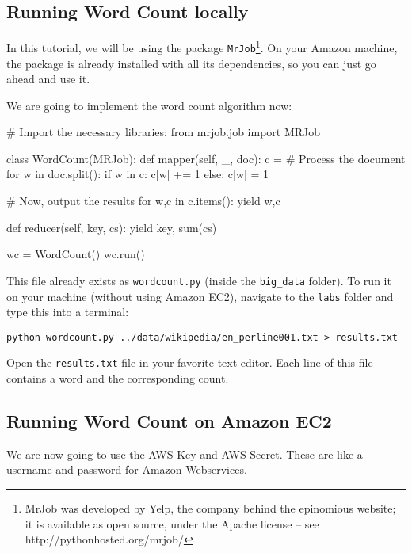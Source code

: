 \subsection{Running Word Count locally}

In this tutorial, we will be using the package \texttt{MrJob}\footnote{MrJob was developed by Yelp, the company behind the epinomious website; it is available
as open source, under the Apache license -- see http://pythonhosted.org/mrjob/}. On your Amazon machine, the package
is already installed with all its dependencies, so you can just go ahead and
use it.

We are going to implement the word count algorithm now:

\begin{python}
# Import the necessary libraries:
from mrjob.job import MRJob

class WordCount(MRJob):
    def mapper(self, _, doc):
        c = {}
        # Process the document
        for w in doc.split():
            if w in c:
                c[w] += 1
            else:
                c[w] = 1

        # Now, output the results
        for w,c in c.items():
            yield w,c

    def reducer(self, key, cs):
        yield key, sum(cs)

wc = WordCount()
wc.run()
\end{python}

This file already exists as \texttt{wordcount.py} (inside the \texttt{big\_data} folder). To run it on your machine (without using Amazon EC2), navigate to the \texttt{labs} folder and type this into a terminal:

\begin{verbatim}
python wordcount.py ../data/wikipedia/en_perline001.txt > results.txt
\end{verbatim}

Open the \texttt{results.txt} file in your favorite text editor. Each line of this file contains a word and the corresponding count.

\subsection{Running Word Count on Amazon EC2}

We are now going to use the AWS Key and AWS Secret. These are like a username
and password for Amazon Webservices.

